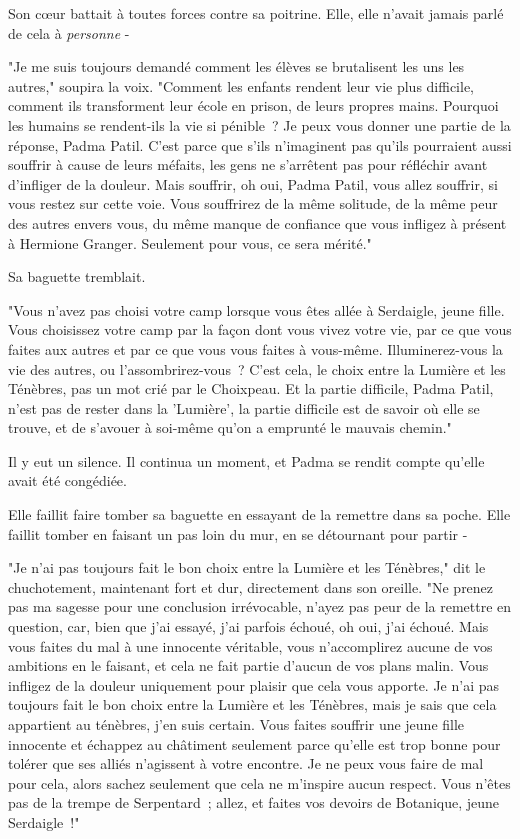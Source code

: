 Son cœur battait à toutes forces contre sa poitrine. Elle, elle n'avait jamais parlé de cela à \emph{personne} -

"Je me suis toujours demandé comment les élèves se brutalisent les uns les autres," soupira la voix. "Comment les enfants rendent leur vie plus difficile, comment ils transforment leur école en prison, de leurs propres mains. Pourquoi les humains se rendent-ils la vie si pénible~? Je peux vous donner une partie de la réponse, Padma Patil. C'est parce que s'ils n'imaginent pas qu'ils pourraient aussi souffrir à cause de leurs méfaits, les gens ne s'arrêtent pas pour réfléchir avant d'infliger de la douleur. Mais souffrir, oh oui, Padma Patil, vous allez souffrir, si vous restez sur cette voie. Vous souffrirez de la même solitude, de la même peur des autres envers vous, du même manque de confiance que vous infligez à présent à Hermione Granger. Seulement pour vous, ce sera mérité."

Sa baguette tremblait.

"Vous n'avez pas choisi votre camp lorsque vous êtes allée à Serdaigle, jeune fille. Vous choisissez votre camp par la façon dont vous vivez votre vie, par ce que vous faites aux autres et par ce que vous vous faites à vous-même. Illuminerez-vous la vie des autres, ou l'assombrirez-vous~? C'est cela, le choix entre la Lumière et les Ténèbres, pas un mot crié par le Choixpeau. Et la partie difficile, Padma Patil, n'est pas de rester dans la 'Lumière', la partie difficile est de savoir où elle se trouve, et de s'avouer à soi-même qu'on a emprunté le mauvais chemin."

Il y eut un silence. Il continua un moment, et Padma se rendit compte qu'elle avait été congédiée.

Elle faillit faire tomber sa baguette en essayant de la remettre dans sa poche. Elle faillit tomber en faisant un pas loin du mur, en se détournant pour partir -

"Je n'ai pas toujours fait le bon choix entre la Lumière et les Ténèbres," dit le chuchotement, maintenant fort et dur, directement dans son oreille. "Ne prenez pas ma sagesse pour une conclusion irrévocable, n'ayez pas peur de la remettre en question, car, bien que j'ai essayé, j'ai parfois échoué, oh oui, j'ai échoué. Mais vous faites du mal à une innocente véritable, vous n'accomplirez aucune de vos ambitions en le faisant, et cela ne fait partie d'aucun de vos plans malin. Vous infligez de la douleur uniquement pour plaisir que cela vous apporte. Je n'ai pas toujours fait le bon choix entre la Lumière et les Ténèbres, mais je sais que cela appartient au ténèbres, j'en suis certain. Vous faites souffrir une jeune fille innocente et échappez au châtiment seulement parce qu'elle est trop bonne pour tolérer que ses alliés n'agissent à votre encontre. Je ne peux vous faire de mal pour cela, alors sachez seulement que cela ne m'inspire aucun respect. Vous n'êtes pas de la trempe de Serpentard~; allez, et faites vos devoirs de Botanique, jeune Serdaigle~!"

